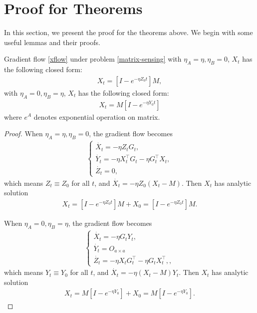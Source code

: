 \section{Proof for Theorems}

In this section, we present the proof for the theorems above. We begin with some useful lemmas and their proofs. 

\begin{lemma}
    \label{asymlora-close-form}
    Gradient flow \ref{xflow} under problem \ref{matrix-sensing} with $\eta_A=\eta, \eta_B=0$, $X_t$ has the following closed form:
    \begin{align}
        X_t=\left[I-e^{-\eta Z_0t}\right]M,
    \end{align}
    with $\eta_A=0, \eta_B=\eta$, $X_t$ has the following closed form:
    \begin{align}
        X_t=M\left[I-e^{-\eta Y_0t}\right]
    \end{align}
    where $e^{A}$ denotes exponential operation on matrix. 
\end{lemma}
\begin{proof}
    When $\eta_A=\eta, \eta_B=0$, the gradient flow becomes
    \begin{align}
        \begin{cases}
            \dot{X_t}=-\eta Z_tG_t,\\
            \dot{Y_t}=-\eta X_t^\top G_t-\eta G_t^\top X_t,\\
            \dot{Z_t}=0,
        \end{cases}
    \end{align}
    which means $Z_t\equiv Z_0$ for all $t$, and $\dot{X_t}=-\eta Z_0(X_t-M)$. Then $X_t$ has analytic solution 
    \begin{align}
        X_t=\left[I-e^{-\eta Z_0t}\right]M+X_0=\left[I-e^{-\eta Z_0t}\right]M.
    \end{align}

    When $\eta_A=0, \eta_B=\eta$, the gradient flow becomes
    \begin{align}
        \begin{cases}
            \dot{X_t}=-\eta G_tY_t,\\
            \dot{Y_t}=O_{a\times a}\\
            \dot{Z_t}=-\eta X_t G_t^\top-\eta G_t X_t^\top,,
        \end{cases}
    \end{align}
    which means $Y_t\equiv Y_0$ for all $t$, and $\dot{X_t}=-\eta (X_t-M)Y_t$. Then $X_t$ has analytic solution 
    \begin{align}
        X_t=M\left[I-e^{-\eta Y_0}\right]+X_0=M\left[I-e^{-\eta Y_0}\right].
    \end{align}
\end{proof}
